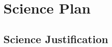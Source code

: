 \documentclass[letterpaper,12pt]{article}
\begin{document}

\section{Science Plan}

%
%
%

\subsection{Science Justification}
\end{document}
